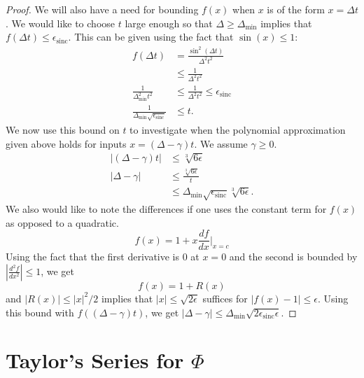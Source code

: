 \documentclass{article}
\newcommand{\abs}[1]{\left| #1 \right|}
\DeclareMathOperator{\sinc}{sinc}
\begin{document}
\begin{proof}
    We will also have a need for bounding $f(x)$ when $x$ is of the form $x = \Delta t$. We would like to choose $t$ large enough so that $\Delta \geq \Delta_{\text{min}}$ implies that $f(\Delta t) \leq \epsilon_{\sinc}$. This can be given using the fact that $\sin(x) \leq 1$:
    \begin{align}
        f(\Delta t) &= \frac{\sin^2(\Delta t)}{\Delta^2 t^2} \\
        &\leq \frac{1}{\Delta^2 t^2} \\
        \frac{1}{\Delta_{\text{min}}^2 t^2} &\leq \frac{1}{\Delta^2 t^2} \leq \epsilon_{\sinc} \\
        \frac{1}{\Delta_{\text{min}} \sqrt{\epsilon_{\sinc}}} &\leq t.
    \end{align}
    We now use this bound on $t$ to investigate when the polynomial approximation given above holds for inputs $x = (\Delta - \gamma)t$. We assume $\gamma \geq 0 $.
    \begin{align}
        |(\Delta - \gamma)t| &\leq \sqrt[3]{6\epsilon} \\
        \abs{\Delta - \gamma} &\leq \frac{\sqrt[3]{6 \epsilon}}{t} \\
        &\leq \Delta_{\text{min}} \sqrt{\epsilon_{\sinc}}\sqrt[3]{6 \epsilon}.
    \end{align}
    We also would like to note the differences if one uses the constant term for $f(x)$ as opposed to a quadratic.
    $$f(x) = 1 + x \frac{df}{dx}\bigg|_{x=c}$$
    Using the fact that the first derivative is 0 at $x= 0$ and the second is bounded by $\abs{\frac{d^2f}{dx^2}} \leq 1$, we get
    $$f(x) = 1 + R(x)$$
    and $\abs{R(x)} \leq |x|^2 / 2$ implies that $|x| \leq \sqrt{2\epsilon}$ suffices for $\abs{f(x) - 1} \leq \epsilon$. Using this bound with $f((\Delta - \gamma)t)$, we get $\abs{\Delta - \gamma} \leq \Delta_{\text{min}} \sqrt{2 \epsilon_{\sinc} \epsilon} $.
\end{proof}

\section{Taylor's Series for $\Phi$}
\end{document}
